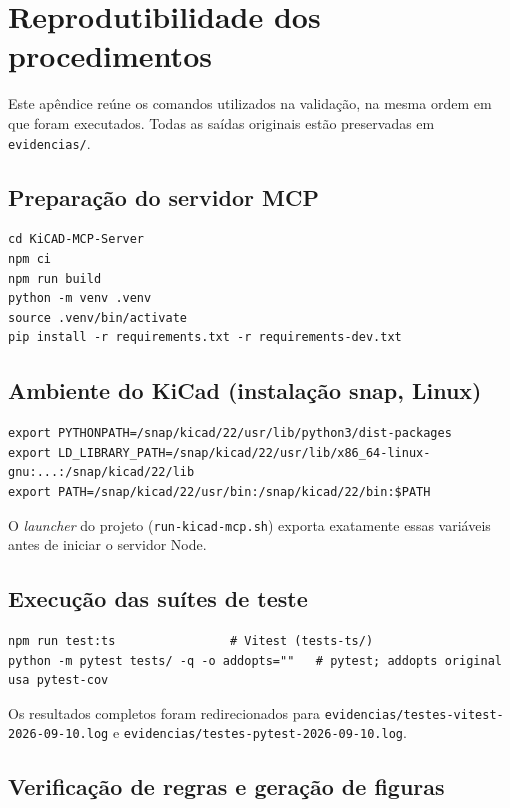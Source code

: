 \chapter{Reprodutibilidade dos procedimentos}\label{ap:repro}

Este apêndice reúne os comandos utilizados na validação, na mesma ordem em
que foram executados. Todas as saídas originais estão preservadas em
\texttt{evidencias/}.

\section{Preparação do servidor MCP}

\begin{verbatim}
cd KiCAD-MCP-Server
npm ci
npm run build
python -m venv .venv
source .venv/bin/activate
pip install -r requirements.txt -r requirements-dev.txt
\end{verbatim}

\section{Ambiente do KiCad (instalação snap, Linux)}

\begin{verbatim}
export PYTHONPATH=/snap/kicad/22/usr/lib/python3/dist-packages
export LD_LIBRARY_PATH=/snap/kicad/22/usr/lib/x86_64-linux-gnu:...:/snap/kicad/22/lib
export PATH=/snap/kicad/22/usr/bin:/snap/kicad/22/bin:$PATH
\end{verbatim}

O \emph{launcher} do projeto (\texttt{run-kicad-mcp.sh}) exporta exatamente
essas variáveis antes de iniciar o servidor Node.

\section{Execução das suítes de teste}

\begin{verbatim}
npm run test:ts                # Vitest (tests-ts/)
python -m pytest tests/ -q -o addopts=""   # pytest; addopts original usa pytest-cov
\end{verbatim}

Os resultados completos foram redirecionados para
\texttt{evidencias/testes-vitest-2026-09-10.log} e
\texttt{evidencias/testes-pytest-2026-09-10.log}.

\section{Verificação de regras e geração de figuras}

